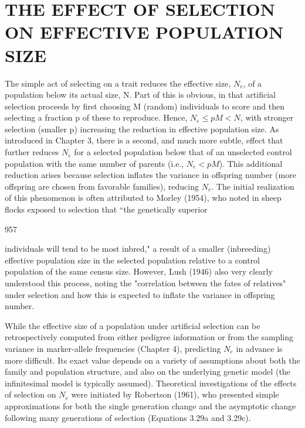 \documentclass{article}
\begin{document}
\section{THE EFFECT OF SELECTION ON EFFECTIVE POPULATION SIZE}
The simple act of selecting on a trait reduces the effective size,  $ N_e $, of a population below its actual size, N. Part of this is obvious, in that artificial selection proceeds by first choosing M (random) individuals to score and then selecting a fraction p of these to reproduce. Hence,  $ N_e \leq pM < N $, with stronger selection (smaller p) increasing the reduction in effective population size. As introduced in Chapter 3, there is a second, and much more subtle, effect that further reduces  $ N_e $ for a selected population below that of an unselected control population with the same number of parents (i.e.,  $ N_e < pM $). This additional reduction arises because selection inflates the variance in offspring number (more offspring are chosen from favorable families), reducing  $ N_e $. The initial realization of this phenomenon is often attributed to Morley (1954), who noted in sheep flocks exposed to selection that “the genetically superior

957

individuals will tend to be most inbred," a result of a smaller (inbreeding) effective population size in the selected population relative to a control population of the same census size. However, Lush (1946) also very clearly understood this process, noting the "correlation between the fates of relatives" under selection and how this is expected to inflate the variance in offspring number.

While the effective size of a population under artificial selection can be retrospectively computed from either pedigree information or from the sampling variance in marker-allele frequencies (Chapter 4), predicting  $ N_{e} $ in advance is more difficult. Its exact value depends on a variety of assumptions about both the family and population structure, and also on the underlying genetic model (the infinitesimal model is typically assumed). Theoretical investigations of the effects of selection on  $ N_{e} $ were initiated by Robertson (1961), who presented simple approximations for both the single generation change and the asymptotic change following many generations of selection (Equations 3.29a and 3.29c).
\end{document}
